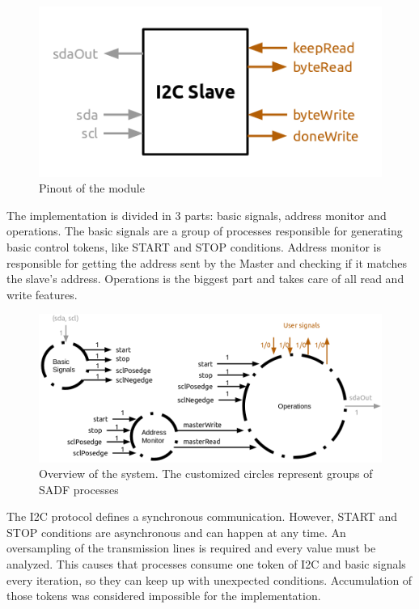 \documentclass{article}
\begin{document}
\begin{figure}
  \includegraphics[width=\linewidth]{img/pinout.png}
  \caption{Pinout of the module}
  \label{fig:pinout}
\end{figure}

The implementation is divided in 3 parts: basic signals, address monitor and operations. The basic signals are a group of processes responsible for generating basic control tokens, like START and STOP conditions. Address monitor is responsible for getting the address sent by the Master and checking if it matches the slave's address. Operations is the biggest part and takes care of all read and write features.

\begin{figure}
  \includegraphics[width=\linewidth]{img/overview.png}
  \caption{Overview of the system. The customized circles represent groups of SADF processes}
  \label{fig:overview}
\end{figure}

The I2C protocol defines a synchronous communication. However, START and STOP conditions are asynchronous and can happen at any time. An oversampling of the transmission lines is required and every value must be analyzed. This causes that processes consume one token of I2C and basic signals every iteration, so they can keep up with unexpected conditions. Accumulation of those tokens was considered impossible for the implementation.
\end{document}
